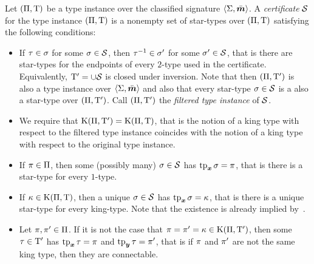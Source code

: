 \begin{definition}
Let $(\Pi,\mathrm{T})$ be a type instance over the classified signature
$\left\langle \mathrm{\Sigma},\bar{\bm{m}} \right\rangle$.
A \emph{certificate} $\mathcal{S}$ for the type instance
$(\Pi,\mathrm{T})$ is a nonempty set of star-types over $(\Pi,\mathrm{T})$
satisfying the following conditions:
\begin{itemize}
  \item[\condcerti]\label{cond:certi}
  If $\tau\in\sigma$ for some $\sigma\in\mathcal{S}$, then $\tau^{-1}\in\sigma'$ for
  some $\sigma'\in\mathcal{S}$, that is there are star-types for the endpoints of every
  $2$-type used in the certificate. Equivalently, ${\mathrm{T}'} = \cup\mathcal{S}$ is closed
  under inversion. Note that then $(\Pi,{\mathrm{T}'})$ is also a type instance over
  $\left\langle \mathrm{\Sigma},\bar{\bm{m}} \right\rangle$ and also that every star-type $\sigma \in \mathcal{S}$ is a also a
  star-type over $(\Pi,{\mathrm{T}'})$. Call $(\Pi,{\mathrm{T}'})$ the \emph{filtered
  type instance} of $\mathcal{S}$.
  \item[\condcertK]\label{cond:certK}
  We require that $\mathrm{K}(\Pi,{\mathrm{T}'}) = \mathrm{K}(\Pi,\mathrm{T})$, that is the notion of a
  king type with respect to the filtered type instance coincides with the notion
  of a king type with respect to the original type instance.
  \item[\condcertp]\label{cond:certp}
  If $\pi \in \Pi$, then some (possibly many) $\sigma \in \mathcal{S}$ has
  $\operatorname{tp}_{\bm{x}}\sigma = \pi$, that is there is a star-type for every $1$-type.
  \item[\condcertk]\label{cond:certk}
  If $\kappa \in \mathrm{K}(\Pi,\mathrm{T})$, then a unique $\sigma \in \mathcal{S}$ has
  $\operatorname{tp}_{\bm{x}}\sigma = \kappa$, that is there is a unique star-type for every king-type.
  Note that the existence is already implied by~.
  \item[\condcertc]\label{cond:certc}
  Let $\pi, {\pi'} \in \Pi$. If it is not the case that $\pi =
  {\pi'} = \kappa \in \mathrm{K}(\Pi,{\mathrm{T}'})$, then some $\tau \in {\mathrm{T}'}$ has
  $\operatorname{tp}_{\bm{x}}\tau = \pi$ and $\operatorname{tp}_{\bm{y}}\tau = {\pi'}$, that is if $\pi$ and ${\pi'}$
  are not the same king type, then they are connectable.
\end{itemize}
\end{definition}

